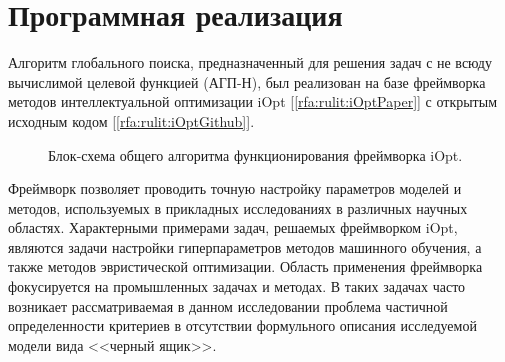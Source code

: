 \documentclass[a4paper,12pt,russian]{article}
\begin{document}
\section{Программная реализация} \label{iOpt_discr}

Алгоритм глобального поиска, предназначенный для решения задач с не всюду вычислимой целевой функцией (АГП-Н), был реализован на базе фреймворка методов интеллектуальной оптимизации iOpt [\ref{rfa:rulit:iOptPaper}] с открытым исходным кодом [\ref{rfa:rulit:iOptGithub}].

\begin{figure}[h!]
	\caption{Блок-схема общего алгоритма функционирования фреймворка iOpt.}
	\label{fig_iOpt}
\end{figure}

Фреймворк позволяет проводить точную настройку параметров моделей и методов, используемых в прикладных исследованиях в различных научных областях. Характерными примерами задач, решаемых фреймворком iOpt, являются задачи настройки гиперпараметров методов машинного обучения, а также методов эвристической оптимизации. Область применения фреймворка фокусируется на промышленных задачах и методах. В таких задачах часто возникает рассматриваемая в данном исследовании проблема частичной определенности критериев в отсутствии формульного описания исследуемой модели вида <<черный ящик>>. 
\end{document}
